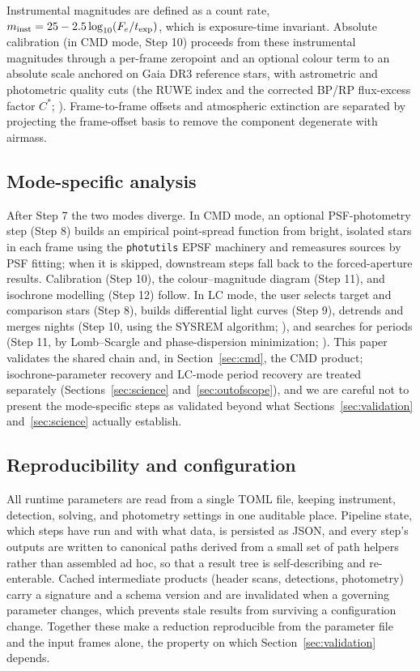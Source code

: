 \documentclass[fleqn,usenatbib]{mnras}
\begin{document}
Instrumental magnitudes are defined as a count rate, $m_{\rm inst} = 25 - 2.5\log_{10}(F_e / t_{\rm exp})$, which is exposure-time invariant. Absolute calibration (in CMD mode, Step 10) proceeds from these instrumental magnitudes through a per-frame zeropoint and an optional colour term to an absolute scale anchored on Gaia DR3 \citep{gaia_dr3_2023} reference stars, with astrometric and photometric quality cuts (the RUWE index and the corrected BP/RP flux-excess factor $C^*$; \citealt{riello2021}). Frame-to-frame offsets and atmospheric extinction are separated by projecting the frame-offset basis to remove the component degenerate with airmass.

\subsection{Mode-specific analysis}

After Step 7 the two modes diverge. In CMD mode, an optional PSF-photometry step (Step 8) builds an empirical point-spread function from bright, isolated stars in each frame using the \texttt{photutils} EPSF machinery and remeasures sources by PSF fitting; when it is skipped, downstream steps fall back to the forced-aperture results. Calibration (Step 10), the colour--magnitude diagram (Step 11), and isochrone modelling (Step 12) follow. In LC mode, the user selects target and comparison stars (Step 8), builds differential light curves (Step 9), detrends and merges nights (Step 10, using the SYSREM algorithm; \citealt{tamuz2005}), and searches for periods (Step 11, by Lomb--Scargle and phase-dispersion minimization; \citealt{stellingwerf1978}). This paper validates the shared chain and, in Section~\ref{sec:cmd}, the CMD product; isochrone-parameter recovery and LC-mode period recovery are treated separately (Sections~\ref{sec:science} and~\ref{sec:outofscope}), and we are careful not to present the mode-specific steps as validated beyond what Sections~\ref{sec:validation} and~\ref{sec:science} actually establish.

\subsection{Reproducibility and configuration}

All runtime parameters are read from a single TOML file, keeping instrument, detection, solving, and photometry settings in one auditable place. Pipeline state, which steps have run and with what data, is persisted as JSON, and every step's outputs are written to canonical paths derived from a small set of path helpers rather than assembled ad hoc, so that a result tree is self-describing and re-enterable. Cached intermediate products (header scans, detections, photometry) carry a signature and a schema version and are invalidated when a governing parameter changes, which prevents stale results from surviving a configuration change. Together these make a reduction reproducible from the parameter file and the input frames alone, the property on which Section~\ref{sec:validation} depends.
\end{document}

